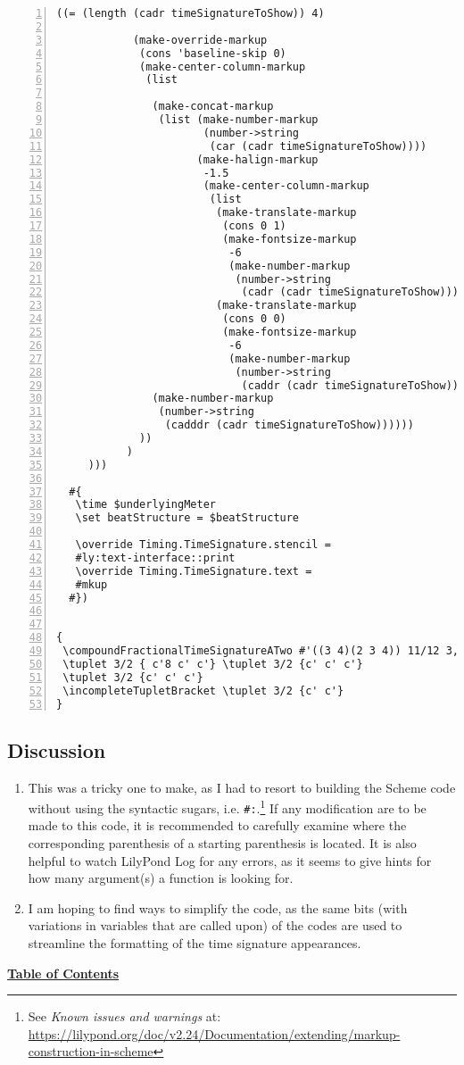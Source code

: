 \begin{Verbatim}[numbers=left,xleftmargin=5mm]
           ((= (length (cadr timeSignatureToShow)) 4)

            (make-override-markup
             (cons 'baseline-skip 0)
             (make-center-column-markup
              (list

               (make-concat-markup
                (list (make-number-markup
                       (number->string
                        (car (cadr timeSignatureToShow))))
                      (make-halign-markup
                       -1.5
                       (make-center-column-markup
                        (list
                         (make-translate-markup
                          (cons 0 1)
                          (make-fontsize-markup
                           -6
                           (make-number-markup
                            (number->string
                             (cadr (cadr timeSignatureToShow))))))
                         (make-translate-markup
                          (cons 0 0)
                          (make-fontsize-markup
                           -6
                           (make-number-markup
                            (number->string
                             (caddr (cadr timeSignatureToShow)))))))))))
               (make-number-markup
                (number->string
                 (cadddr (cadr timeSignatureToShow))))))
             ))
           )
     )))

  #{
   \time $underlyingMeter
   \set beatStructure = $beatStructure

   \override Timing.TimeSignature.stencil =
   #ly:text-interface::print
   \override Timing.TimeSignature.text =
   #mkup
  #})


{
 \compoundFractionalTimeSignatureATwo #'((3 4)(2 3 4)) 11/12 3,3,3,2
 \tuplet 3/2 { c'8 c' c'} \tuplet 3/2 {c' c' c'}
 \tuplet 3/2 {c' c' c'}
 \incompleteTupletBracket \tuplet 3/2 {c' c'}
}
\end{Verbatim}
\label{sec:compoundfractionalmeter_discussion}
\subsection{Discussion}
\begin{enumerate}
\item This was a tricky one to make, as I had to resort to building the Scheme code without using the syntactic sugars, i.e. \verb|#:|.\footnote{See \textit{Known issues and warnings} at: \url{https://lilypond.org/doc/v2.24/Documentation/extending/markup-construction-in-scheme}} If any modification are to be made to this code, it is recommended to carefully examine where the corresponding parenthesis of a starting parenthesis is located. It is also helpful to watch LilyPond Log for any errors, as it seems to give hints for how many argument(s) a function is looking for. 
\item I am hoping to find ways to simplify the code, as the same bits (with variations in variables that are called upon) of the codes are used to streamline the formatting of the time signature appearances. 
\end{enumerate}
\hyperref[sec:toc]{\textbf{Table of Contents}}

